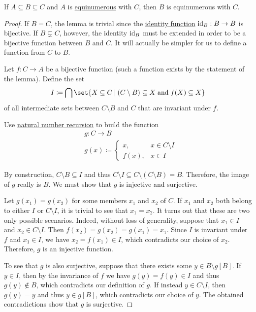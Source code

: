 \begin{lemma}\label{thm:three_equinumerous_sets_lemma}
  If \( A \subseteq B \subseteq C \) and \( A \) is \hyperref[def:equinumerosity]{equinumerous} with \( C \), then \( B \) is equinumerous with \( C \).
\end{lemma}
\begin{proof}
  If \( B = C \), the lemma is trivial since the \hyperref[def:set_valued_map/identity]{identity function} \( \operatorname{id}_B: B \to B \) is bijective. If \( B \subsetneq C \), however, the identity \( \operatorname{id}_B \) must be extended in order to be a bijective function between \( B \) and \( C \). It will actually be simpler for us to define a function from \( C \) to \( B \).

  Let \( f: C \to A \) be a bijective function (such a function exists by the statement of the lemma). Define the set
  \begin{equation*}
    I \coloneqq \bigcap\set{ X \subseteq C \given (C \setminus B) \subseteq X \T{and} f(X) \subseteq X }
  \end{equation*}
  of all intermediate sets between \( C \setminus B \) and \( C \) that are invariant under \( f \).

  Use \hyperref[rem:natural_number_recursion]{natural number recursion} to build the function
  \begin{equation*}
    \begin{aligned}
      &g: C \to B \\
      &g(x) \coloneqq \begin{cases}
        x,    &x \in C \setminus I \\
        f(x), &x \in I
      \end{cases}
    \end{aligned}
  \end{equation*}

  By construction, \( C \setminus B \subseteq I \) and thus \( C \setminus I \subseteq C \setminus (C \setminus B) = B \). Therefore, the image of \( g \) really is \( B \). We must show that \( g \) is injective and surjective.

  Let \( g(x_1) = g(x_2) \) for some members \( x_1 \) and \( x_2 \) of \( C \). If \( x_1 \) and \( x_2 \) both belong to either \( I \) or \( C \setminus I \), it is trivial to see that \( x_1 = x_2 \). It turns out that these are two only possible scenarios. Indeed, without loss of generality, suppose that \( x_1 \in I \) and \( x_2 \in C \setminus I \). Then \( f(x_2) = g(x_2) = g(x_1) = x_1 \). Since \( I \) is invariant under \( f \) and \( x_1 \in I \), we have \( x_2 = f(x_1) \in I \), which contradicts our choice of \( x_2 \). Therefore, \( g \) is an injective function.

  To see that \( g \) is also surjective, suppose that there exists some \( y \in B \setminus g[B] \). If \( y \in I \), then by the invariance of \( f \) we have \( g(y) = f(y) \in I \) and thus \( g(y) \not\in B \), which contradicts our definition of \( g \). If instead \( y \in C \setminus I \), then \( g(y) = y \) and thus \( y \in g[B] \), which contradicts our choice of \( y \). The obtained contradictions show that \( g \) is surjective.
\end{proof}

